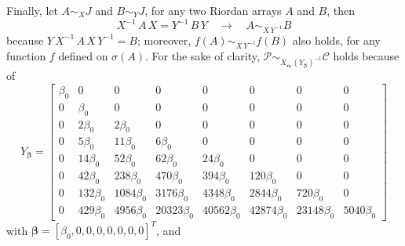Finally, let $A \sim_{X} J$ and $B \sim_{Y} J$, for any two Riordan arrays $A$ and $B$, then
\begin{displaymath}
    X^{-1}\,A\,X = Y^{-1}\,B\,Y \quad\rightarrow\quad A \sim_{X\,Y^{-1}} B
\end{displaymath}
because $Y\,X^{-1}\,A\,X\,Y^{-1} = B$; moreover, $f(A) \sim_{X\,Y^{-1}} f(B)$
also holds, for any function $f$ defined on $\sigma(A)$. For the sake of
clarity, $\mathcal{P} \sim_{X_{\boldsymbol{\alpha}}\,\left(Y_{\boldsymbol{\beta}}\right)^{-1}}\mathcal{C}$ holds
because of
\begin{displaymath}
Y_{\boldsymbol{\beta}} = \left[\begin{matrix}\beta_{0} & 0 & 0 & 0 & 0 & 0 & 0 & 0\\0 & \beta_{0} & 0 & 0 & 0 & 0 & 0 & 0\\0 & 2 \beta_{0} & 2 \beta_{0} & 0 & 0 & 0 & 0 & 0\\0 & 5 \beta_{0} & 11 \beta_{0} & 6 \beta_{0} & 0 & 0 & 0 & 0\\0 & 14 \beta_{0} & 52 \beta_{0} & 62 \beta_{0} & 24 \beta_{0} & 0 & 0 & 0\\0 & 42 \beta_{0} & 238 \beta_{0} & 470 \beta_{0} & 394 \beta_{0} & 120 \beta_{0} & 0 & 0\\0 & 132 \beta_{0} & 1084 \beta_{0} & 3176 \beta_{0} & 4348 \beta_{0} & 2844 \beta_{0} & 720 \beta_{0} & 0\\0 & 429 \beta_{0} & 4956 \beta_{0} & 20323 \beta_{0} & 40562 \beta_{0} & 42874 \beta_{0} & 23148 \beta_{0} & 5040 \beta_{0}\end{matrix}\right]
\end{displaymath}
with $\boldsymbol{\beta} = \left[ \beta_{0}, 0,0,0,0,0,0,0 \right]^{T}$, and
